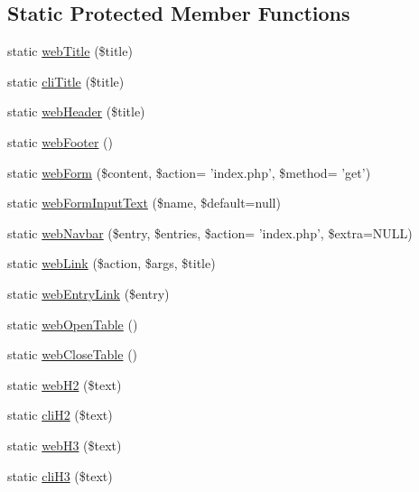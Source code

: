 \subsection*{Static Protected Member Functions}
\begin{DoxyCompactItemize}
\item 
static \hyperlink{classCinisisDisplayHelper_af3849efbba5e6980ddfdb4ceddb6ad17}{webTitle} (\$title)
\item 
static \hyperlink{classCinisisDisplayHelper_a8f0c8aec5b11a144b14278d287238c85}{cliTitle} (\$title)
\item 
static \hyperlink{classCinisisDisplayHelper_a356d8117dfcb220b7bb9996b569f5f25}{webHeader} (\$title)
\item 
static \hyperlink{classCinisisDisplayHelper_aa331cd95a86ffd270784736e74f253e6}{webFooter} ()
\item 
static \hyperlink{classCinisisDisplayHelper_a7ba5dd0ddd1ba9de5efdbfa1b62d4efa}{webForm} (\$content, \$action= 'index.php', \$method= 'get')
\item 
static \hyperlink{classCinisisDisplayHelper_a4c8934dc88cda9c7a894106b4dc7abba}{webFormInputText} (\$name, \$default=null)
\item 
static \hyperlink{classCinisisDisplayHelper_a291e2da97fd646e7fa34fb92879fc3d6}{webNavbar} (\$entry, \$entries, \$action= 'index.php', \$extra=NULL)
\item 
static \hyperlink{classCinisisDisplayHelper_aadc869909d8be43402d73fa3415827b4}{webLink} (\$action, \$args, \$title)
\item 
static \hyperlink{classCinisisDisplayHelper_a7ffe33c336d0b495807a2c4bae78cbfb}{webEntryLink} (\$entry)
\item 
static \hyperlink{classCinisisDisplayHelper_a4028def92d8511e525251ec7ab06246d}{webOpenTable} ()
\item 
static \hyperlink{classCinisisDisplayHelper_ab4e55ec58b59bc8b2af32b93cdf0d7c1}{webCloseTable} ()
\item 
static \hyperlink{classCinisisDisplayHelper_a0f2e5c78f6fdd146df04382e497cfe94}{webH2} (\$text)
\item 
static \hyperlink{classCinisisDisplayHelper_aa15ca1975a280814a1cdc2df82b8c67d}{cliH2} (\$text)
\item 
static \hyperlink{classCinisisDisplayHelper_acc20c726a214895584d15a434b2f3548}{webH3} (\$text)
\item 
static \hyperlink{classCinisisDisplayHelper_a1ed9ee357ffda8e2efd885a6eae20550}{cliH3} (\$text)
\item 

\end{DoxyCompactItemize}
